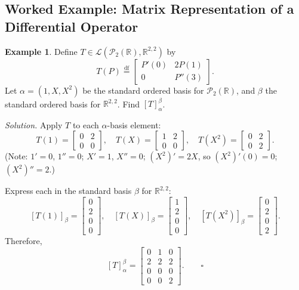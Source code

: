 \documentclass[11pt, a4paper, notitlepage]{report}
\theoremstyle{definition}
\newtheorem{example}[theorem]{Example}
\theoremstyle{remark}
\begin{document}
\subsection{Worked Example: Matrix Representation of a Differential Operator}

\begin{example}\label{ex:matrix-rep-deriv}
Define $T \in \mathcal{L}(\mathscr{P}_2(\mathbb{R}), \mathbb{R}^{2,2})$ by
\[
  T(P) \stackrel{\mathrm{df}}{=} \begin{bmatrix} P'(0) & 2P(1) \\ 0 & P''(3) \end{bmatrix}.
\]
Let $\alpha = (1, X, X^2)$ be the standard ordered basis for $\mathscr{P}_2(\mathbb{R})$, and
$\beta$ the standard ordered basis for $\mathbb{R}^{2,2}$. Find $[T]_\alpha^\beta$.

\emph{Solution.} Apply $T$ to each $\alpha$-basis element:
\[
  T(1) = \begin{bmatrix}0&2\\0&0\end{bmatrix}, \quad
  T(X) = \begin{bmatrix}1&2\\0&0\end{bmatrix}, \quad
  T(X^2) = \begin{bmatrix}0&2\\0&2\end{bmatrix}.
\]
(Note: $1' = 0$, $1'' = 0$; $X' = 1$, $X'' = 0$; $(X^2)' = 2X$, so $(X^2)'(0)=0$; $(X^2)'' = 2$.)

Express each in the standard basis $\beta$ for $\mathbb{R}^{2,2}$:
\[
  [T(1)]_\beta = \begin{bmatrix}0\\2\\0\\0\end{bmatrix}, \quad
  [T(X)]_\beta = \begin{bmatrix}1\\2\\0\\0\end{bmatrix}, \quad
  [T(X^2)]_\beta = \begin{bmatrix}0\\2\\0\\2\end{bmatrix}.
\]
Therefore,
\[
  [T]_\alpha^\beta = \begin{bmatrix} 0 & 1 & 0 \\ 2 & 2 & 2 \\ 0 & 0 & 0 \\ 0 & 0 & 2 \end{bmatrix}. \qquad \square
\]
\end{example}
\end{document}
